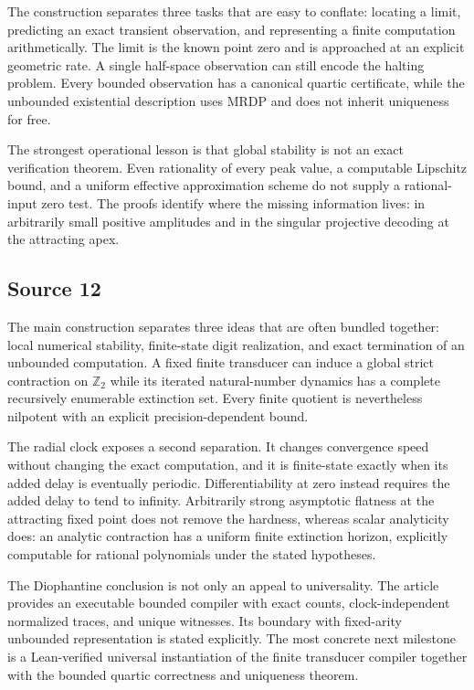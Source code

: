 \documentclass[11pt,letterpaper]{article}
\numberwithin{equation}{section}
\theoremstyle{definition}
\theoremstyle{remark}
\newcommand{\Ztwo}{\mathbb Z_2}
\begin{document}
The construction separates three tasks that are easy to conflate: locating
a limit, predicting an exact transient observation, and representing a
finite computation arithmetically. The limit is the known point zero and is
approached at an explicit geometric rate. A single half-space observation
can still encode the halting problem. Every bounded observation has a
canonical quartic certificate, while the unbounded existential description
uses MRDP and does not inherit uniqueness for free.

The strongest operational lesson is that global stability is not an exact
verification theorem. Even rationality of every peak value, a computable
Lipschitz bound, and a uniform effective approximation scheme do not supply
a rational-input zero test. The proofs identify where the missing
information lives: in arbitrarily small positive amplitudes and in the
singular projective decoding at the attracting apex.

\clearpage
\subsection{Source 12}
The main construction separates three ideas that are often bundled
together: local numerical stability, finite-state digit realization, and
exact termination of an unbounded computation. A fixed finite transducer
can induce a global strict contraction on $\Ztwo$ while its iterated
natural-number dynamics has a complete recursively enumerable extinction
set. Every finite quotient is nevertheless nilpotent with an explicit
precision-dependent bound.

The radial clock exposes a second separation. It changes convergence
speed without changing the exact computation, and it is finite-state
exactly when its added delay is eventually periodic. Differentiability at
zero instead requires the added delay to tend to infinity. Arbitrarily strong
asymptotic flatness at the attracting fixed point does not remove the
hardness, whereas scalar analyticity does: an analytic contraction has a
uniform finite extinction horizon, explicitly computable for rational
polynomials under the stated hypotheses.

The Diophantine conclusion is not only an appeal to universality. The
article provides an executable bounded compiler with exact counts,
clock-independent normalized traces, and unique witnesses. Its boundary
with fixed-arity unbounded representation is stated explicitly. The most
concrete next milestone is a Lean-verified universal instantiation of the
finite transducer compiler together with the bounded quartic correctness
and uniqueness theorem.
\end{document}
